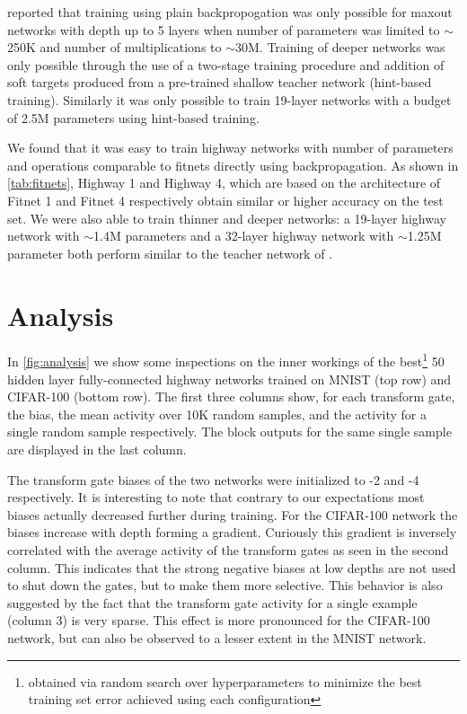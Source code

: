\documentclass{article}
\begin{document}
\citet{Romero2014} reported that training using plain backpropogation was only possible for maxout networks with depth up to 5 layers when number of parameters was limited to $\sim$250K and number of multiplications to $\sim$30M. Training of deeper networks was only possible through the use of a two-stage training procedure and addition of soft targets produced from a pre-trained shallow teacher network (hint-based training). Similarly it was only possible to train 19-layer networks with a budget of 2.5M parameters using hint-based training. 

We found that it was easy to train highway networks with number of parameters and operations comparable to fitnets directly using backpropagation. As shown in \autoref{tab:fitnets}, Highway 1 and Highway 4, which are based on the architecture of Fitnet 1 and Fitnet 4 respectively obtain similar or higher accuracy on the test set. We were also able to train thinner and deeper networks: a 19-layer highway network with $\sim$1.4M parameters and a 32-layer highway network with $\sim$1.25M parameter both perform similar to the teacher network of \citet{Romero2014}.

\section{Analysis}

In \autoref{fig:analysis} we show some inspections on the inner workings of the best\footnote{obtained via random search over hyperparameters to minimize the best training set error achieved using each configuration} 50 hidden layer fully-connected highway networks trained on MNIST (top row) and CIFAR-100 (bottom row). The first three columns show, for each transform gate, the bias, the mean activity over 10K random samples, and the activity for a single random sample respectively. The block outputs for the same single sample are displayed in the last column. 

The transform gate biases of the two networks were initialized to -2 and -4 respectively. 
It is interesting to note that contrary to our expectations most biases actually decreased further during training. 
For the CIFAR-100 network the biases increase with depth forming a gradient. 
Curiously this gradient is inversely correlated with the average activity of the transform gates as seen in the second column.
This indicates that the strong negative biases at low depths are not used to shut down the gates, but to make them more selective. 
This behavior is also suggested by the fact that the transform gate activity for a single example (column 3) is very sparse. 
This effect is more pronounced for the CIFAR-100 network, but can also be observed to a lesser extent in the MNIST network.
\end{document}
